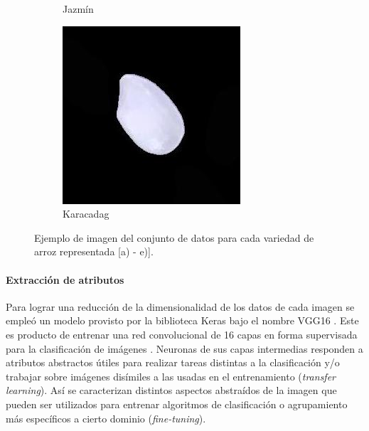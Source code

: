 \documentclass{article}
\begin{document}
\begin{figure} [!htb]
\begin{subfigure}[b]{0.18\textwidth}
		\caption{Jazmín}
	\end{subfigure}
	\begin{subfigure}[b]{0.18\textwidth}
		\includegraphics[width= \textwidth]{fg/Karacadag.jpg}
		\caption{Karacadag}
	\end{subfigure}
	\caption{Ejemplo de imagen del conjunto de datos para cada variedad de arroz representada [a) - e)].}	
\label{fg_ejemplos}
\end{figure}


\paragraph{Extracción de atributos} 
Para lograr una reducción de la dimensionalidad de los datos de cada imagen se empleó un modelo provisto por la biblioteca Keras bajo el nombre VGG16 \cite{team_keras_nodate}.
Este es producto de entrenar una red convolucional de 16 capas en forma supervisada para la clasificación de imágenes \cite{simonyan_very_2015}.
Neuronas de sus capas intermedias responden a atributos abstractos útiles para realizar tareas distintas a la clasificación y/o trabajar sobre imágenes disímiles a las usadas en el entrenamiento (\textit{transfer learning}).
Así se caracterizan distintos aspectos abstraídos de la imagen que pueden ser utilizados para entrenar algoritmos de clasificación o agrupamiento más específicos a cierto dominio (\textit{fine-tuning}).  
\end{document}
